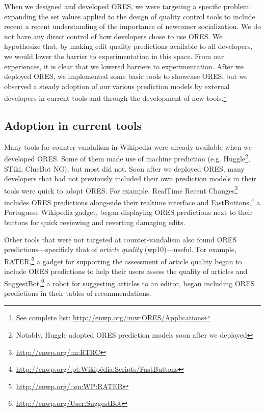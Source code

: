 When we designed and developed ORES, we were targeting a specific problem: expanding the set values applied to the design of quality control tools to include recent a recent understanding of the importance of newcomer socialization.  We do not have any direct control of how developers chose to use ORES.  We hypothesize that, by making edit quality predictions available to all developers, we would lower the barrier to experimentation in this space.  From our experiences, it is clear that we lowered barriers to experimentation.  After we deployed ORES, we implemented some basic tools to showcase ORES, but we observed a steady adoption of our various prediction models by external developers in current tools and through the development of new tools.\footnote{See complete list: \url{http://enwp.org/:mw:ORES/Applications}}

\subsection{Adoption in current tools}
Many tools for counter-vandalism in Wikipedia were already available when we developed ORES.  Some of them made use of machine prediction (e.g. Huggle\footnote{Notably, Huggle adopted ORES prediction models soon after we deployed}, STiki, ClueBot NG), but most did not.  Soon after we deployed ORES, many developers that had not previously included their own prediction models in their tools were quick to adopt ORES.  For example, RealTime Recent Changes\footnote{\url{http://enwp.org/:m:RTRC}} includes ORES predictions along-side their realtime interface and FastButtons,\footnote{\url{http://enwp.org/:pt:Wikipédia:Scripts/FastButtons}} a Portuguese Wikipedia gadget, began displaying ORES predictions next to their buttons for quick reviewing and reverting damaging edits.

Other tools that were not targeted at counter-vandalism also found ORES predictions---specificly that of \emph{article quality} (wp10)---useful.  For example, RATER,\footnote{\url{http://enwp.org/::en:WP:RATER}} a gadget for supporting the assessment of article quality began to include ORES predictions to help their users assess the quality of articles and SuggestBot,\footnote{\url{http://enwp.org/User:SuggestBot}}\cite{cosley2007suggestbot} a robot for suggesting articles to an editor, began including ORES predictions in their tables of recommendations.

